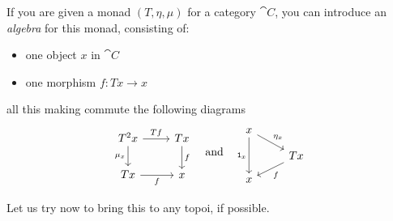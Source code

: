 \begin{definition}
If you are given a monad \((T, \eta, \mu)\) for a category \(\cat C\), you can introduce an {\em algebra} for this monad, consisting of:
\begin{itemize}
\item one object \(x\) in \(\cat C\)
\item one morphism \(f : T x \to x\)
\end{itemize}
all this making commute the following diagrams
\[\begin{tikzcd}
T^2 x \ar["Tf", r] \ar["{\mu_x}", d, swap] & Tx \ar["f", d] \\
T x \ar["f", r, swap] & x
\end{tikzcd} \quad\text{and}\quad \begin{tikzcd}[row sep=small]
x \ar["{\id_x}", dd, swap] \ar["{\eta_x}", dr] \\
& Tx \ar["f", dl] \\
x %
\end{tikzcd}\]
\end{definition}



Let us try now to bring this to any topoi, if possible.
